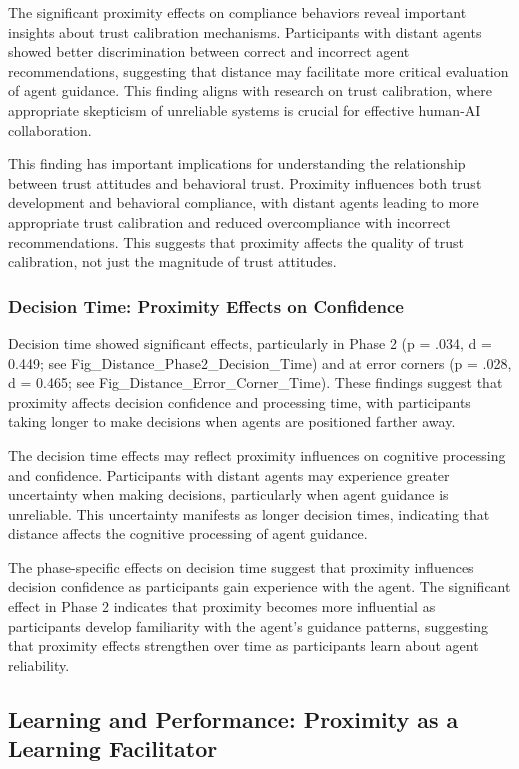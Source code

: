 \documentclass[12pt]{article}
\begin{document}
The significant proximity effects on compliance behaviors reveal important insights about trust calibration mechanisms. Participants with distant agents showed better discrimination between correct and incorrect agent recommendations, suggesting that distance may facilitate more critical evaluation of agent guidance. This finding aligns with research on trust calibration, where appropriate skepticism of unreliable systems is crucial for effective human-AI collaboration.

This finding has important implications for understanding the relationship between trust attitudes and behavioral trust. Proximity influences both trust development and behavioral compliance, with distant agents leading to more appropriate trust calibration and reduced overcompliance with incorrect recommendations. This suggests that proximity affects the quality of trust calibration, not just the magnitude of trust attitudes.

\subsubsection{Decision Time: Proximity Effects on Confidence}

Decision time showed significant effects, particularly in Phase 2 (p = .034, d = 0.449; see Fig\_Distance\_Phase2\_Decision\_Time) and at error corners (p = .028, d = 0.465; see Fig\_Distance\_Error\_Corner\_Time). These findings suggest that proximity affects decision confidence and processing time, with participants taking longer to make decisions when agents are positioned farther away.

The decision time effects may reflect proximity influences on cognitive processing and confidence. Participants with distant agents may experience greater uncertainty when making decisions, particularly when agent guidance is unreliable. This uncertainty manifests as longer decision times, indicating that distance affects the cognitive processing of agent guidance.

The phase-specific effects on decision time suggest that proximity influences decision confidence as participants gain experience with the agent. The significant effect in Phase 2 indicates that proximity becomes more influential as participants develop familiarity with the agent's guidance patterns, suggesting that proximity effects strengthen over time as participants learn about agent reliability.

\subsection{Learning and Performance: Proximity as a Learning Facilitator}
\end{document}
